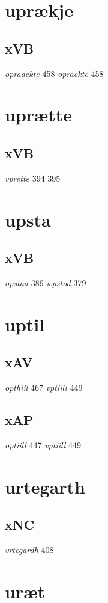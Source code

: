 \documentclass[a4paper,twocolumn]{article}
\begin{document}
\section{uprækje}
\label{sec:org7307cd3}
\subsection{xVB}
\label{sec:org506bb30}
\emph{opraackte} 458 \emph{oprackte} 458 
\section{uprætte}
\label{sec:orgf0cdbfc}
\subsection{xVB}
\label{sec:orge8f61e6}
\emph{vprette} 394 395 
\section{upsta}
\label{sec:org5461607}
\subsection{xVB}
\label{sec:org3e44334}
\emph{opstaa} 389 \emph{wpstod} 379 
\section{uptil}
\label{sec:orgbe69ff3}
\subsection{xAV}
\label{sec:org2f2979c}
\emph{opthiil} 467 \emph{vptiill} 449 
\subsection{xAP}
\label{sec:org5eeef12}
\emph{optiill} 447 \emph{vptiill} 449 
\section{urtegarth}
\label{sec:orgfda9c33}
\subsection{xNC}
\label{sec:org08f6d57}
\emph{vrtegardh} 408 
\section{uræt}
\label{sec:orgb98f169}
\end{document}
